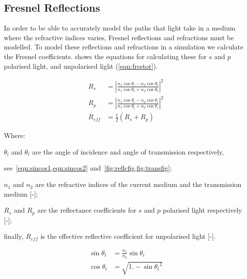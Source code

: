 \begin{appendices}

\chapter{Fresnel Reflections}
\label{app:fresnelappend}

In order to be able to accurately model the paths that light take in a medium where the refractive indices varies, Fresnel reflections and refractions must be modelled.
To model these reflections and refractions in a simulation we calculate the Fresnel coefficients.
 shows the equations for calculating these for $s$ and $p$ polarised light, and unpolarised light (\cref{eqn:frestot}).


\begin{align}
R_s&=\left|\frac{n_1 \cos\theta_i-n_2\cos\theta_t}{n_1\cos\theta_i+n_2\cos\theta_t}\right|^2\label{eqn:fres1}\\
R_p&=\left|\frac{n_1 \cos\theta_t-n_2\cos\theta_i}{n_1\cos\theta_t+n_2\cos\theta_i}\right|^2\label{eqn:fres2}\\
R_{eff}&=\tfrac{1}{2}\left(R_s+R_p\right)\label{eqn:frestot}
\end{align}

\noindent Where: 

\indent $\theta_i$ and $\theta_t$ are the angle of incidence and angle of transmission respectively,

\indent see~\cref{eqn:sincos1,eqn:sincos2} and~\cref{fig:reflcfig,fig:transfig};

\indent $n_1$ and $n_2$ are the refractive indices of the current medium and the transmission medium [-];

\indent $R_s$ and $R_p$ are the reflectance coefficients for $s$ and $p$ polarised light respectively [-];

\indent finally, $R_{eff}$ is the effective reflective coefficient for unpolarised light [-].

\medskip

\begin{align}
\sin\theta_t&=\frac{n_1}{n_2}\sin\theta_i\label{eqn:sincos1}\\
\cos\theta_t&=\sqrt{1. - {\sin\theta_t}^2}\label{eqn:sincos2}
\end{align}


\end{appendices}
